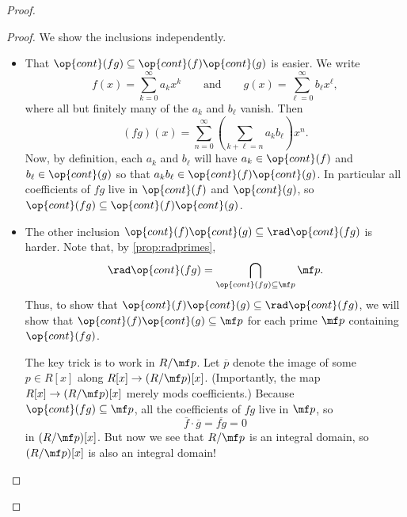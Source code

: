 \begin{proof}
\begin{proof}
		We show the inclusions independently.
		\begin{itemize}
			\item That $\op{cont}(fg)\subseteq\op{cont}(f)\op{cont}(g)$ is easier. We write
			\[f(x)=\sum_{k=0}^\infty a_kx^k\qquad\text{and}\qquad g(x)=\sum_{\ell=0}^\infty b_\ell x^\ell,\]
			where all but finitely many of the $a_k$ and $b_\ell$ vanish. Then
			\[(fg)(x)=\sum_{n=0}^\infty\left(\sum_{k+\ell=n}a_kb_\ell\right)x^n.\]
			Now, by definition, each $a_k$ and $b_\ell$ will have $a_k\in\op{cont}(f)$ and $b_\ell\in\op{cont}(g)$ so that $a_kb_\ell\in\op{cont}(f)\op{cont}(g)$. In particular all coefficients of $fg$ live in $\op{cont}(f)$ and $\op{cont}(g)$, so $\op{cont}(fg)\subseteq\op{cont}(f)\op{cont}(g)$.

			\item The other inclusion $\op{cont}(f)\op{cont}(g)\subseteq\rad\op{cont}(fg)$ is harder. Note that, by \autoref{prop:radprimes},
			\[\rad\op{cont}(fg)=\bigcap_{\op{cont}(fg)\subseteq\mf p}\mf p.\]
			Thus, to show that $\op{cont}(f)\op{cont}(g)\subseteq\rad\op{cont}(fg)$, we will show that $\op{cont}(f)\op{cont}(g)\subseteq\mf p$ for each prime $\mf p$ containing $\op{cont}(fg)$.

			The key trick is to work in $R/\mf p$. Let $\overline p$ denote the image of some $p\in R[x]$ along $R[x]\to(R/\mf p)[x]$. (Importantly, the map $R[x]\to(R/\mf p)[x]$ merely mods coefficients.) Because $\op{cont}(fg)\subseteq\mf p$, all the coefficients of $fg$ live in $\mf p$, so
			\[\overline f\cdot\overline g=\overline{fg}=0\]
			in $(R/\mf p)[x]$. But now we see that $R/\mf p$ is an integral domain, so $(R/\mf p)[x]$ is also an integral domain!
			

\end{itemize}
\end{proof}
\end{proof}
